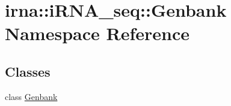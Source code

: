 \hypertarget{namespaceirna_1_1iRNA__seq_1_1Genbank}{
\section{irna\-:\-:i\-R\-N\-A\-\_\-seq\-:\-:\-Genbank \-Namespace \-Reference}
\label{namespaceirna_1_1iRNA__seq_1_1Genbank}
}
\subsection*{\-Classes}
\begin{DoxyCompactItemize}
\item 
class \hyperlink{classirna_1_1iRNA__seq_1_1Genbank_1_1Genbank}{\-Genbank}
\end{DoxyCompactItemize}
